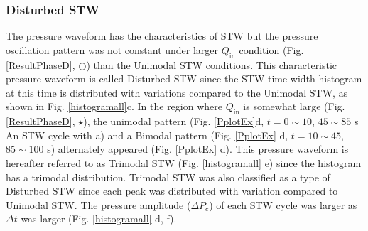 \documentclass[aps,pre,preprint,groupedaddress,showkeys]{revtex4-2}
\begin{document}
\subsubsection{Disturbed STW}
The pressure waveform has the characteristics of STW but the pressure oscillation pattern was not constant under larger $Q_\mathrm{in} $ condition (Fig. \ref {ResultPhaseD}, $\bigcirc$) than the Unimodal STW conditions.
This characteristic pressure waveform is called Disturbed STW since the STW time width histogram at this time is distributed with variations compared to the Unimodal STW, as shown in Fig. \ref{histogramall}c.
In the region where $ Q_ \mathrm{in} $ is somewhat large (Fig. \ref{ResultPhaseD}, $\star$), the unimodal pattern (Fig. \ref{PplotEx}d, $ t = 0 \sim10 $, $ 45 \sim 85 $ s An STW cycle with a) and a Bimodal pattern (Fig. \ref{PplotEx} d, $ t = 10 \sim 45 $, $ 85 \sim100 $ s) alternately appeared (Fig. \ref{PplotEx} d).
This pressure waveform is hereafter referred to as Trimodal STW (Fig. \ref{histogramall} e) since the histogram has a trimodal distribution.
Trimodal STW was also classified as a type of Disturbed STW since each peak was distributed with variation compared to Unimodal STW. 
The pressure amplitude ($ \Delta P_c $) of each STW cycle was larger as $ \Delta t $ was larger (Fig. \ref{histogramall} d, f).
\end{document}
